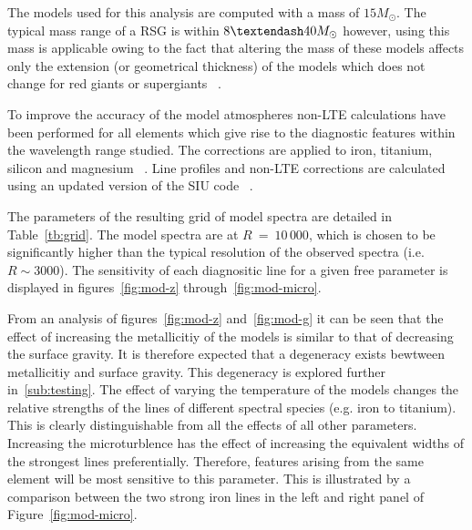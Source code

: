 \documentclass[12pt]{article}
\begin{document}
The models used for this analysis are computed with a mass of $15M_{\odot}$.
The typical mass range of a RSG is within $8 \textendash40M_{\odot}$ however,
using this mass is applicable owing to the fact that altering the mass of these models affects only the extension
(or geometrical thickness) of the models which does not change for red giants or supergiants
~\citep{2010MNRAS.407.1203D}.

To improve the accuracy of the model atmospheres
non-LTE calculations have been performed for all elements which give rise to the diagnostic features within the wavelength range studied.
The corrections are applied to iron, titanium, silicon and magnesium
~\citep{2012ApJ...751..156B,2013ApJ...764..115B,2014arXiv1412.6527B}.
Line profiles and non-LTE corrections are calculated using an updated version of the SIU code
~\citep{1999PhDT.........3R,2012ApJ...751..156B}.

The parameters of the resulting grid of model spectra are detailed in
Table~\ref{tb:grid}.
The model spectra are at $R~=~10\,000$,
which is chosen to be significantly higher than the typical resolution of the observed spectra
(i.e. $R\sim 3000$).
The sensitivity of each diagnositic line for a given free parameter is displayed in figures~\ref{fig:mod-z} through~\ref{fig:mod-micro}.

From an analysis of figures~\ref{fig:mod-z} and~\ref{fig:mod-g} it can be seen that the effect of increasing the metallicitiy of the models is similar to that of decreasing the surface gravity.
It is therefore expected that a degeneracy exists bewtween metallicitiy and surface gravity.
This degeneracy is explored further in~\ref{sub:testing}.
The effect of varying the temperature of the models changes the relative strengths of the lines of
different spectral species (e.g. iron to titanium).
This is clearly distinguishable from all the effects of all other parameters.
Increasing the microturblence has the effect of increasing the equivalent widths
of the strongest lines preferentially.
Therefore, features arising from the same element will be most sensitive to this
parameter.
This is illustrated by a comparison between the two strong iron lines in the left and
right panel of Figure~\ref{fig:mod-micro}.
\end{document}
